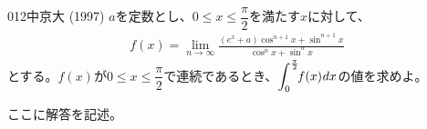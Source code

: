 \begin{thm}{012}{}{中京大 (1997)}
 $a$を定数とし、$0\le x \le \dfrac{\pi}{2}$を満たす$x$に対して、
 \begin{align*}
  f(x)=\lim_{n\rightarrow\infty}\frac{(e^x+a)\cos^{n+1}x+\sin^{n+1}x}{\cos^nx+\sin^nx}
 \end{align*}
 とする。$f(x)$が$0\le x \le \dfrac{\pi}{2}$で連続であるとき、$\displaystyle \int^{\frac{\pi}{2}}_0\!\! f(x) \hspace{0.1ex}dx$の値を求めよ。
\end{thm}

ここに解答を記述。